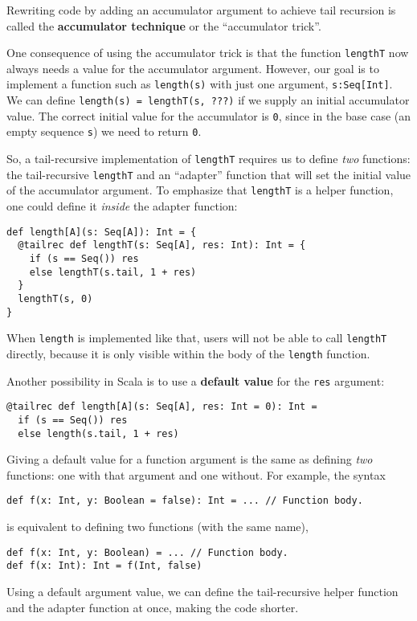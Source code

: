 Rewriting code by adding an accumulator argument to achieve tail recursion
is called the \textbf{accumulator technique} or the ``accumulator
trick''.

One consequence of using the accumulator trick is that the function
\lstinline!lengthT! now always needs a value for the accumulator
argument. However, our goal is to implement a function such as \lstinline!length(s)!
with just one argument, \lstinline!s:Seq[Int]!. We can define \lstinline!length(s) = lengthT(s, ???)!
if we supply an initial accumulator value. The correct initial value
for the accumulator is \lstinline!0!, since in the base case (an
empty sequence \lstinline!s!) we need to return \lstinline!0!.

So, a tail-recursive implementation of \lstinline!lengthT! requires
us to define \emph{two} functions: the tail-recursive \lstinline!lengthT!
and an ``adapter'' function that will set the initial value of the
accumulator argument. To emphasize that \lstinline!lengthT! is a
helper function, one could define it \emph{inside} the adapter function:
\begin{lstlisting}
def length[A](s: Seq[A]): Int = {
  @tailrec def lengthT(s: Seq[A], res: Int): Int = {
    if (s == Seq()) res
    else lengthT(s.tail, 1 + res)
  }
  lengthT(s, 0)
}
\end{lstlisting}
When \lstinline!length! is implemented like that, users will not
be able to call \lstinline!lengthT! directly, because it is only
visible within the body of the \lstinline!length! function.

Another possibility in Scala is to use a \textbf{default value}
for the \lstinline!res! argument:
\begin{lstlisting}
@tailrec def length[A](s: Seq[A], res: Int = 0): Int = 
  if (s == Seq()) res
  else length(s.tail, 1 + res)
\end{lstlisting}
Giving a default value for a function argument is the same as defining
\emph{two} functions: one with that argument and one without. For
example, the syntax
\begin{lstlisting}
def f(x: Int, y: Boolean = false): Int = ... // Function body.
\end{lstlisting}
is equivalent to defining two functions (with the same name),
\begin{lstlisting}
def f(x: Int, y: Boolean) = ... // Function body.
def f(x: Int): Int = f(Int, false)
\end{lstlisting}
Using a default argument value, we can define the tail-recursive helper
function and the adapter function at once, making the code shorter.

